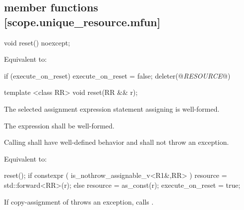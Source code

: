 \documentclass[ebook,11pt,article]{memoir}
\begin{document}
\subsection { member functions [scope.unique_resource.mfun]}

\begin{itemdecl}
void reset() noexcept;
\end{itemdecl}

\begin{itemdescr}

\pnum
\effects
Equivalent to:
\begin{codeblock}
if (execute_on_reset) {
    execute_on_reset = false;
    deleter(@\textit{RESOURCE}@)
}
\end{codeblock}
\end{itemdescr}

\begin{itemdecl}
template <class RR>
void reset(RR && r);
\end{itemdecl}

\begin{itemdescr}
\pnum
\constraints The selected assignment expression statement assigning  is well-formed.

\pnum
\mandates
The expression  shall be well-formed.

\pnum
\expects
Calling  shall have well-defined behavior and shall not throw an exception.

\pnum
\effects 
Equivalent to:
\begin{codeblock}
reset();
if constexpr ( is_nothrow_assignable_v<R1&,RR> )
    resource = std::forward<RR>(r);
else
    resource = as_const(r);
execute_on_reset = true;
\end{codeblock}

If copy-assignment of  throws an exception, calls .

\end{itemdescr}



\end{document}
